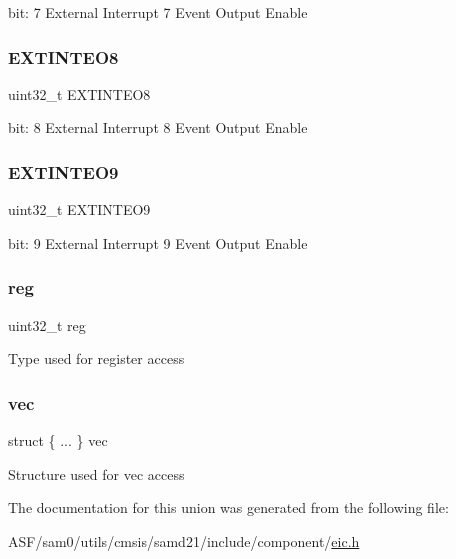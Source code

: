 bit\+: 7 External Interrupt 7 Event Output Enable \mbox{\label{union_e_i_c___e_v_c_t_r_l___type_a54cb54548da358805cbcb11b3b147235}} 
\subsubsection{\texorpdfstring{EXTINTEO8}{EXTINTEO8}}
{\footnotesize\ttfamily uint32\+\_\+t E\+X\+T\+I\+N\+T\+E\+O8}

bit\+: 8 External Interrupt 8 Event Output Enable \mbox{\label{union_e_i_c___e_v_c_t_r_l___type_aeb36e52ac1ce38b6c7968e1d6a78821b}} 
\subsubsection{\texorpdfstring{EXTINTEO9}{EXTINTEO9}}
{\footnotesize\ttfamily uint32\+\_\+t E\+X\+T\+I\+N\+T\+E\+O9}

bit\+: 9 External Interrupt 9 Event Output Enable \mbox{\label{union_e_i_c___e_v_c_t_r_l___type_a6b91636401516a477989a336376d7b40}} 
\subsubsection{\texorpdfstring{reg}{reg}}
{\footnotesize\ttfamily uint32\+\_\+t reg}

Type used for register access \mbox{\label{union_e_i_c___e_v_c_t_r_l___type_a0503fd5f76f9a37081e26ec5cefb57b9}} 
\subsubsection{\texorpdfstring{vec}{vec}}
{\footnotesize\ttfamily struct \{ ... \}   vec}

Structure used for vec access 

The documentation for this union was generated from the following file\+:\begin{DoxyCompactItemize}
\item 
A\+S\+F/sam0/utils/cmsis/samd21/include/component/\mbox{\hyperlink{component_2eic_8h}{eic.\+h}}\end{DoxyCompactItemize}
